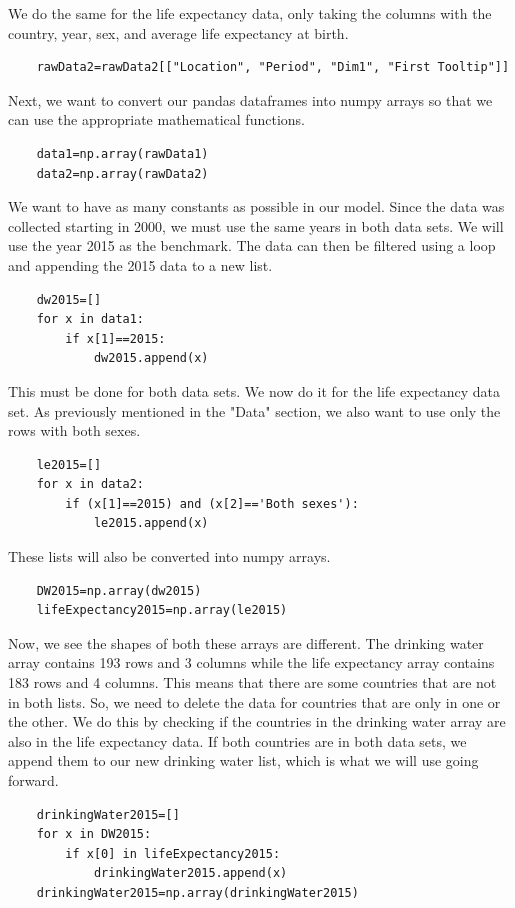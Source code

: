 \documentclass[12pt]{article}
\begin{document}
We do the same for the life expectancy data, only taking the columns with the country, year, sex, and average life expectancy at birth.
\begin{verbatim}
    rawData2=rawData2[["Location", "Period", "Dim1", "First Tooltip"]]
\end{verbatim}

Next, we want to convert our pandas dataframes into numpy arrays so that we can use the appropriate mathematical functions.
\begin{verbatim}
    data1=np.array(rawData1)
    data2=np.array(rawData2)
\end{verbatim}

We want to have as many constants as possible in our model. Since the data was collected starting in 2000, we must use the same years in both data sets. We will use the year 2015 as the benchmark. The data can then be filtered using a loop and appending the 2015 data to a new list.
\begin{verbatim}
    dw2015=[]
    for x in data1:
        if x[1]==2015:
            dw2015.append(x)
\end{verbatim}

This must be done for both data sets. We now do it for the life expectancy data set. As previously mentioned in the "Data" section, we also want to use only the rows with both sexes.
\begin{verbatim}
    le2015=[]
    for x in data2:
        if (x[1]==2015) and (x[2]=='Both sexes'):
            le2015.append(x)
\end{verbatim}

These lists will also be converted into numpy arrays.
\begin{verbatim}
    DW2015=np.array(dw2015)
    lifeExpectancy2015=np.array(le2015)
\end{verbatim}

Now, we see the shapes of both these arrays are different. The drinking water array contains 193 rows and 3 columns while the life expectancy array contains 183 rows and 4 columns. This means that there are some countries that are not in both lists. So, we need to delete the data for countries that are only in one or the other. We do this by checking if the countries in the drinking water array are also in the life expectancy data. If both countries are in both data sets, we append them to our new drinking water list, which is what we will use going forward.
\begin{verbatim}
    drinkingWater2015=[]
    for x in DW2015:
        if x[0] in lifeExpectancy2015:
            drinkingWater2015.append(x)
    drinkingWater2015=np.array(drinkingWater2015)
\end{verbatim}
\end{document}
